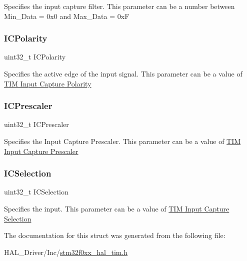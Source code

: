 Specifies the input capture filter. This parameter can be a number between Min\+\_\+\+Data = 0x0 and Max\+\_\+\+Data = 0xF \mbox{\label{struct_t_i_m___i_c___init_type_def_a6c0364c24e89f17849b0109236112fba}} 
\subsubsection{\texorpdfstring{I\+C\+Polarity}{ICPolarity}}
{\footnotesize\ttfamily uint32\+\_\+t I\+C\+Polarity}

Specifies the active edge of the input signal. This parameter can be a value of \hyperlink{group___t_i_m___input___capture___polarity}{T\+IM Input Capture Polarity} \mbox{\label{struct_t_i_m___i_c___init_type_def_adc795cd98eeaa7725743856652cd2b4a}} 
\subsubsection{\texorpdfstring{I\+C\+Prescaler}{ICPrescaler}}
{\footnotesize\ttfamily uint32\+\_\+t I\+C\+Prescaler}

Specifies the Input Capture Prescaler. This parameter can be a value of \hyperlink{group___t_i_m___input___capture___prescaler}{T\+IM Input Capture Prescaler} \mbox{\label{struct_t_i_m___i_c___init_type_def_a280cec08ad0ea4608ae57523775cc1c0}} 
\subsubsection{\texorpdfstring{I\+C\+Selection}{ICSelection}}
{\footnotesize\ttfamily uint32\+\_\+t I\+C\+Selection}

Specifies the input. This parameter can be a value of \hyperlink{group___t_i_m___input___capture___selection}{T\+IM Input Capture Selection} 

The documentation for this struct was generated from the following file\+:\begin{DoxyCompactItemize}
\item 
H\+A\+L\+\_\+\+Driver/\+Inc/\hyperlink{stm32f0xx__hal__tim_8h}{stm32f0xx\+\_\+hal\+\_\+tim.\+h}\end{DoxyCompactItemize}
